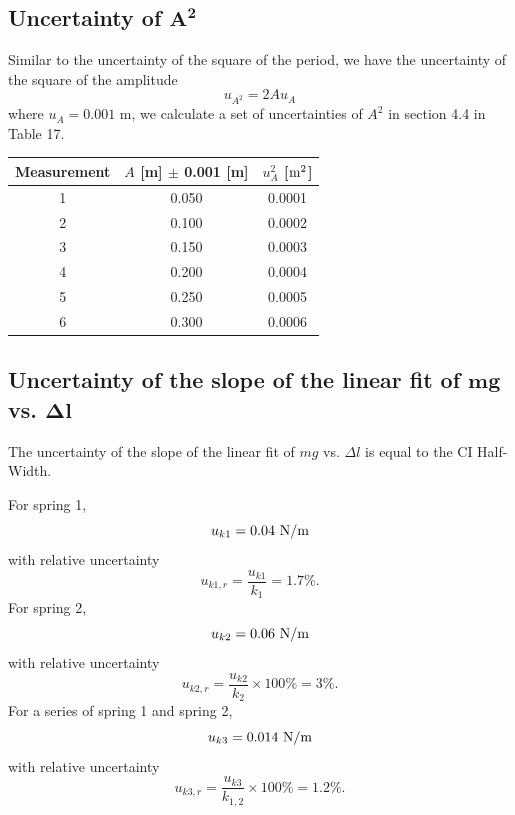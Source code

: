 \documentclass[a4paper]{report}
\begin{document}
	\subsection{Uncertainty of $\bm{A^2}$}
	Similar to the uncertainty of the square of the period, we have the uncertainty of the square of the amplitude
	\begin{equation*}
	u_{A^2}=2Au_A
	\end{equation*}
	where $u_A=0.001$ m, we calculate a set of uncertainties of $A^2$ in section 4.4 in Table 17.
	\begin{table}[H]
		\centering
		\begin{tabular}{|c|c|c|}
			\hline
			Measurement&$A$ [m] $\pm$ 0.001 [m]&$u_A^2$ [$\rm{m^2}$]\\
			\hline
			1&0.050&0.0001\\
			\hline
			2&0.100&0.0002\\
			\hline
			3&0.150&0.0003\\
			\hline
			4&0.200&0.0004\\
			\hline
			5&0.250&0.0005\\
			\hline
			6&0.300&0.0006\\
			\hline
		\end{tabular}
	\end{table}
	\subsection{Uncertainty of the slope of the linear fit of $\bm{mg}$ vs. $\bm{\Delta l}$}
	The uncertainty of the slope of the linear fit of $mg$ vs. $\Delta l$ is equal to the CI Half-Width.
	
	For spring 1,
	\begin{equation*}
	u_{k1}=0.04\ \rm{N/m}
	\end{equation*}
	with relative uncertainty
	\begin{equation*}
	u_{k1,r}=\dfrac{u_{k1}}{k_1}=1.7\%.
	\end{equation*}
	For spring 2,
	\begin{equation*}
	u_{k2}=0.06\ \rm{N/m}
	\end{equation*}
	with relative uncertainty
	\begin{equation*}
	u_{k2,r}=\dfrac{u_{k2}}{k_2}\times100\%=3\%.
	\end{equation*}
	For a series of spring 1 and spring 2,
	\begin{equation*}
	u_{k3}=0.014\ \rm{N/m}
	\end{equation*}
	with relative uncertainty
	\begin{equation*}
	u_{k3,r}=\dfrac{u_{k3}}{k_{1,2}}\times100\%=1.2\%.
	\end{equation*}
\end{document}
